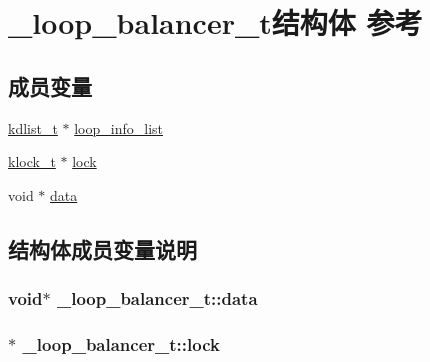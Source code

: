 \hypertarget{a00030}{}\section{\+\_\+loop\+\_\+balancer\+\_\+t结构体 参考}
\label{a00030}
\subsection*{成员变量}
\begin{DoxyCompactItemize}
\item 
\hyperlink{a00053_ae098586334a621a23cef7cb17590b618_ae098586334a621a23cef7cb17590b618}{kdlist\+\_\+t} $\ast$ \hyperlink{a00030_aeff91729503ee321c810ada2ba860cfe_aeff91729503ee321c810ada2ba860cfe}{loop\+\_\+info\+\_\+list}
\item 
\hyperlink{a00053_a4c2f62ab63ab1fd49c71e52bbda0f393_a4c2f62ab63ab1fd49c71e52bbda0f393}{klock\+\_\+t} $\ast$ \hyperlink{a00030_a289429cc01c4a58cce0e07bd05e278ea_a289429cc01c4a58cce0e07bd05e278ea}{lock}
\item 
void $\ast$ \hyperlink{a00030_adf9607bc30dbe281c9cb2f5d1b9aa992_adf9607bc30dbe281c9cb2f5d1b9aa992}{data}
\end{DoxyCompactItemize}


\subsection{结构体成员变量说明}
\hypertarget{a00030_adf9607bc30dbe281c9cb2f5d1b9aa992_adf9607bc30dbe281c9cb2f5d1b9aa992}{}
\subsubsection[{data}]{\setlength{\rightskip}{0pt plus 5cm}void$\ast$ \+\_\+loop\+\_\+balancer\+\_\+t\+::data}\label{a00030_adf9607bc30dbe281c9cb2f5d1b9aa992_adf9607bc30dbe281c9cb2f5d1b9aa992}
\hypertarget{a00030_a289429cc01c4a58cce0e07bd05e278ea_a289429cc01c4a58cce0e07bd05e278ea}{}
\subsubsection[{lock}]{$\ast$ \+\_\+loop\+\_\+balancer\+\_\+t\+::lock}\label{a00030_a289429cc01c4a58cce0e07bd05e278ea_a289429cc01c4a58cce0e07bd05e278ea}
\hypertarget{a00030_aeff91729503ee321c810ada2ba860cfe_aeff91729503ee321c810ada2ba860cfe}{}
